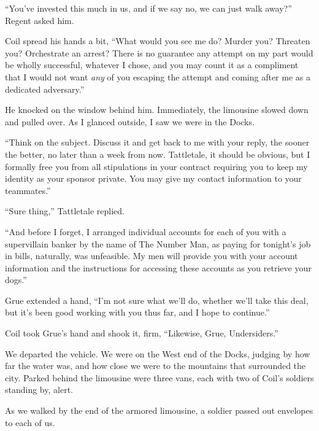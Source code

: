 ``You've invested this much in us, and if we say no, we can just walk away?''  Regent asked him.



Coil spread his hands a bit, ``What would you see me do?  Murder you?  Threaten you?  Orchestrate an arrest?  There is no guarantee any attempt on my part would be wholly successful, whatever I chose, and you may count it as a compliment that I would not want \emph{any} of you escaping the attempt and coming after me as a dedicated adversary.''



He knocked on the window behind him.  Immediately, the limousine slowed down and pulled over.  As I glanced outside, I saw we were in the Docks.



``Think on the subject.  Discuss it and get back to me with your reply, the sooner the better, no later than a week from now.  Tattletale, it should be obvious, but I formally free you from all stipulations in your contract requiring you to keep my identity as your sponsor private.  You may give my contact information to your teammates.''



``Sure thing,'' Tattletale replied.



``And before I forget, I arranged individual accounts for each of you with a supervillain banker by the name of The Number Man, as paying for tonight's job in bills, naturally, was unfeasible.  My men will provide you with your account information and the instructions for accessing these accounts as you retrieve your dogs.''



Grue extended a hand, ``I'm not sure what we'll do, whether we'll take this deal, but it's been good working with you thus far, and I hope to continue.''



Coil took Grue's hand and shook it, firm, ``Likewise, Grue, Undersiders.''



We departed the vehicle.  We were on the West end of the Docks, judging by how far the water was, and how close we were to the mountains that surrounded the city.  Parked behind the limousine were three vans, each with two of Coil's soldiers standing by, alert.



As we walked by the end of the armored limousine, a soldier passed out envelopes to each of us.



